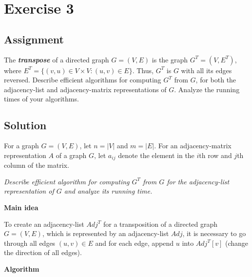 
\section*{Exercise 3}
\label{sec:Ex3}

\subsection*{Assignment}

The \textit{\textbf{transpose}} of a directed graph $G = (V, E)$ is the graph
$G^{T} = (V, E^{T})$, where $E^{T} = \{(v, u) \in V \times V \colon (u, v) \in
E\}$. Thus, $G^{T}$ is $G$ with all its edges reversed. Describe efficient
algorithms for computing $G^{T}$ from $G$, for both the adjacency-list and
adjacency-matrix representations of $G$. Analyze the running times of your
algorithms.

\subsection*{Solution}

For a graph $G = (V, E)$, let $n = |V|$ and $m = |E|$. For an adjacency-matrix
representation $A$ of a graph $G$, let $a_{ij}$ denote the element in the $i$th
row and $j$th column of the matrix.

\textit{Describe efficient algorithm for computing $G^{T}$ from $G$ for the
adjacency-list representation of $G$ and analyze its running time.}

\textbf{Main idea}

To create an adjacency-list $Adj^{T}$ for a transposition of a directed graph
$G = (V, E)$, which is represented by an adjacency-list $Adj$, it is necessary
to go through all edges $(u, v) \in E$ and for each edge, append $u$ into
$Adj^{T}[v]$ (change the direction of all edges).

\textbf{Algorithm}

\begin{algorithm}[H]


\end{algorithm}

